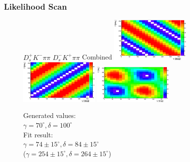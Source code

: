 \documentclass{beamer}
\begin{document}
\begin{frame}
	\frametitle{Likelihood Scan}

	\centering
	
	\begin{figure}[hp]
	\centering
		
		$D_s^+ K^- \pi \pi$      \hspace{2cm}     $D_s^- K^+ \pi \pi$   \hspace{2cm}   Combined
		\includegraphics[width=0.35\textwidth, height = 3.cm]{plots/LL_scan_m.eps} 
		\includegraphics[width=0.35\textwidth, height = 3.cm]{plots/LL_scan_p.eps} 
		\includegraphics[width=0.35\textwidth, height = 3.cm]{plots/LL_scan.eps} 
		
		Generated values: \\  $\gamma = 70^{\circ}, \delta = 100^{\circ}$ \\
		Fit result:    \\ $\gamma = 74 \pm 15^{\circ}, \delta = 84 \pm 15^{\circ}$ \\
		 ($\gamma = 254 \pm 15^{\circ}, \delta = 264 \pm 15^{\circ}$)

		
	\end{figure}		
				
\end{frame}
\end{document}
